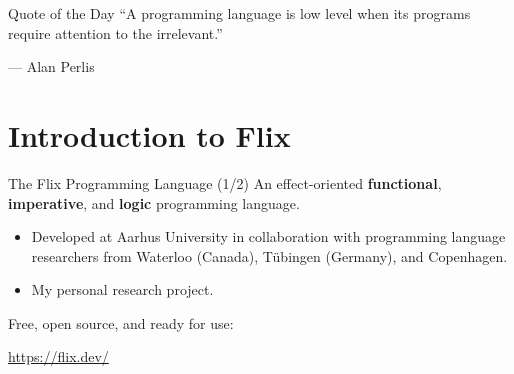 \begin{frame}{Quote of the Day}
``A programming language is low level when its programs require attention to the irrelevant.''

\begin{flushright}
--- Alan Perlis
\end{flushright}
\end{frame}



\section{Introduction to Flix}

\begin{frame}{The Flix Programming Language (1/2)}
An effect-oriented \textbf{functional}, \textbf{imperative}, and \textbf{logic}
programming language.

\begin{itemize}
    \item Developed at Aarhus University in collaboration with programming
    language researchers from Waterloo (Canada), T\"ubingen (Germany), and
    Copenhagen.
    \item My personal research project. 
\end{itemize}

Free, open source, and ready for use:

\begin{center}
    \url{https://flix.dev/}
\end{center}
\end{frame}

